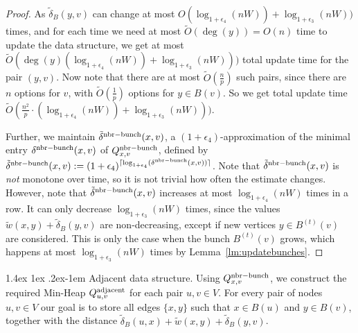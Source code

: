 \documentclass[11pt]{article}
\makeatletter
\theoremstyle{definition}
\theoremstyle{remark}
\newtheorem*{remark}{Remark}
\renewcommand{\paragraph}{%
  \@startsection{paragraph}{4}%
  {\z@}{1.4ex \@plus 1ex \@minus .2ex}{-1em}%
  {\normalfont\normalsize\bfseries}%
}
\makeatother
\begin{document}
\begin{titlepage}
\begin{proof}
    
    As $\tilde\delta_B(y,v)$ can change at most $O(\log_{1+\epsilon_4}(nW))+\log_{1+\epsilon_3}(nW))$ times, and for each time we need at most $\tilde O(\deg(y))=O(n)$ time to update the data structure, we get at most $\tilde O(\deg(y)(\log_{1+\epsilon_4}(nW))+\log_{1+\epsilon_3}(nW)))$ total update time for the pair $(y,v)$. Now note that there are at most $\tilde O(\tfrac{n}{p})$ such pairs, since there are $n$ options for $v$, with $\tilde O(\tfrac{1}{p})$ options for $y\in B(v)$. So we get total update time  $ \tilde O (\tfrac{n^2}{p} \cdot (\log_{1+\epsilon_4}(nW))+\log_{1+\epsilon_3}(nW))) $.
     
    Further, we maintain $\tilde\delta^{\rm{nbr-bunch}}(x,v)$, a $(1+\epsilon_4)$-approximation of the minimal entry $\delta^{\rm{nbr-bunch}}(x,v)$ of $Q^{\rm{nbr-bunch}}_{x,v}$, defined by $\tilde\delta^{\rm{nbr-bunch}}(x,v):= (1+\epsilon_4)^{\lceil\log_{1+\epsilon_4}(\delta^{\rm{nbr-bunch}}(x,v))\rceil}$. 
    Note that $\tilde\delta^{\rm{nbr-bunch}}(x,v)$ is \emph{not} monotone over time, so it is not trivial how often the estimate changes. However, note that $\tilde\delta^{\rm{nbr-bunch}}(x,v)$ increases at most $\log_{1+\epsilon_4}(nW)$ times in a row. It can only decrease $\log_{1+\epsilon_3}(nW)$ times, since the values $\tilde w(x,y)+\tilde\delta_B(y,v)$ are non-decreasing, except if new vertices $y\in B^{(t)}(v)$ are considered. This is only the case when the bunch $B^{(t)}(v)$ grows, which happens at most $\log_{1+\epsilon_3}(nW)$ times by Lemma~\ref{lm:updatebunches}.
\end{proof}


\paragraph{Adjacent data structure.}
Using $Q^{\rm{nbr-bunch}}_{x,v}$, we construct the required Min-Heap $Q^{\rm{adjacent}}_{u,v}$ for each pair $u,v\in V$. For every pair of nodes $ u, v \in V $ our goal is to store all edges $ \{x, y\} $ such that $ x \in B (u) $ and $ y \in B (v) $, together with the distance $\tilde\delta_B(u,x)+\tilde w(x,y)+\tilde\delta_B(y,v)$.


\end{titlepage}
\end{document}
